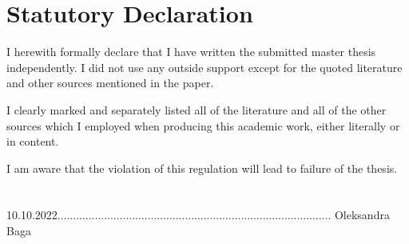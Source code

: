 \chapter*{Statutory Declaration}
I herewith formally declare that I have written the submitted master thesis independently. I did not use any outside support except for the quoted literature and other sources mentioned in the paper. 

I clearly marked and separately listed all of the literature and all of the other sources which I employed when producing this academic work, either literally or in content. 


I am aware that the violation of this regulation will lead to failure of the thesis.\\\\\\

10.10.2022........................................................................................ Oleksandra Baga


